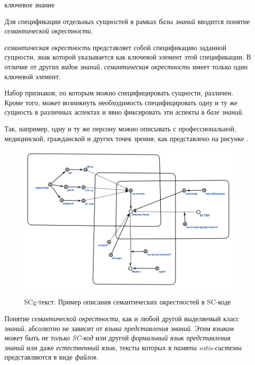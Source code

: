 \begin{SCn}
	\begin{scnrelfromlist}{ключевое знание}
	\end{scnrelfromlist}
\end{SCn}

Для спецификации отдельных сущностей в рамках \textit{базы знаний} вводится понятие \textit{семантической окрестности}. 

\textit{семантическая окрестность} представляет собой спецификацию заданной сущности, знак которой указывается как ключевой элемент этой спецификации. В отличие от других \textit{видов знаний}, \textit{семантическая окрестность} имеет только один ключевой элемент.

Набор признаков, по которым можно специфицировать сущности, различен. Кроме того, может возникнуть необходимость специфицировать одну и ту же сущность в различных аспектах и явно фиксировать эти аспекты в \textit{базе знаний}.

Так, например, одну и ту же персону можно описывать с профессиональной, медицинской, гражданской и других точек зрения, как представлено на рисунке \textit{}. 

\begin{figure}[H]
	\caption{SCg-текст. Пример описания семантических окрестностей в SC-коде}
	\includegraphics[scale=0.7]{author/part2/figures/chapter_kb/semantic_neighborhood.png}
	\label{fig:semantic_neighborhood}
\end{figure}

Понятие \textit{семантической окрестности}, как и любой другой  выделяемый класс \textit{знаний}, абсолютно не зависит от \textit{языка представления знаний}. Этим \textit{языком} может быть не только \textit{SC-код} или другой \textit{формальный язык представления знаний} или даже \textit{естественный язык}, тексты которых в \textit{памяти ostis-системы} представляются в виде \textit{файлов}.

